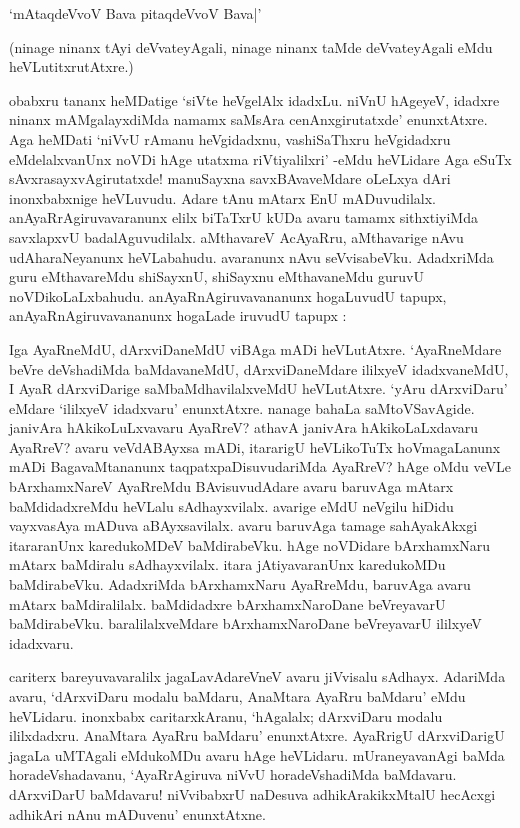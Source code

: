 \begin{shloka}
`mAtaqdeVvoV Bava pitaqdeVvoV Bava|'
\end{shloka}

(ninage ninanx tAyi deVvateyAgali, ninage ninanx taMde deVvateyAgali eMdu heVLutitxrutAtxre.)

obabxru tananx heMDatige `siVte heVgelAlx idadxLu. niVnU hAgeyeV, idadxre ninanx mAMgalayxdiMda namamx saMsAra cenAnxgirutatxde' enunxtAtxre. Aga heMDati `niVvU rAmanu heVgidadxnu, vashiSaThxru heVgidadxru eMdelalxvanUnx noVDi hAge utatxma riVtiyalilxri' -eMdu heVLidare Aga eSuTx sAvxrasayxvAgirutatxde! manuSayxna savxBAvaveMdare oLeLxya dAri inonxbabxnige heVLuvudu. Adare tAnu mAtarx EnU mADuvudilalx. anAyaRrAgiruvavaranunx elilx biTaTxrU kUDa avaru tamamx sithxtiyiMda savxlapxvU badalAguvudilalx. aMthavareV AcAyaRru, aMthavarige nAvu udAharaNeyanunx heVLabahudu. avaranunx nAvu seVvisabeVku. AdadxriMda guru eMthavareMdu shiSayxnU, shiSayxnu eMthavaneMdu guruvU noVDikoLaLxbahudu. anAyaRnAgiruvavananunx hogaLuvudU tapupx, anAyaRnAgiruvavananunx hogaLade iruvudU tapupx :


Iga AyaRneMdU, dArxviDaneMdU viBAga mADi heVLutAtxre. `AyaRneMdare beVre deVshadiMda baMdavaneMdU, dArxviDaneMdare ililxyeV idadxvaneMdU, I AyaR dArxviDarige saMbaMdhavilalxveMdU heVLutAtxre. `yAru dArxviDaru' eMdare `ililxyeV idadxvaru' enunxtAtxre. nanage bahaLa saMtoVSavAgide. janivAra hAkikoLuLxvavaru AyaRreV? athavA janivAra hAkikoLaLxdavaru AyaRreV? avaru veVdABAyxsa mADi, itararigU heVLikoTuTx hoVmagaLanunx mADi BagavaMtananunx taqpatxpaDisuvudariMda AyaRreV? hAge oMdu veVLe bArxhamxNareV AyaRreMdu BAvisuvudAdare avaru baruvAga mAtarx baMdidadxreMdu heVLalu sAdhayxvilalx. avarige eMdU neVgilu hiDidu vayxvasAya mADuva aBAyxsavilalx. avaru baruvAga tamage sahAyakAkxgi itararanUnx karedukoMDeV baMdirabeVku. hAge noVDidare bArxhamxNaru mAtarx baMdiralu sAdhayxvilalx. itara jAtiyavaranUnx karedukoMDu baMdirabeVku. AdadxriMda bArxhamxNaru AyaRreMdu, baruvAga avaru mAtarx baMdiralilalx. baMdidadxre bArxhamxNaroDane beVreyavarU baMdirabeVku. baralilalxveMdare bArxhamxNaroDane beVreyavarU ililxyeV idadxvaru.

cariterx bareyuvavaralilx jagaLavAdareVneV avaru jiVvisalu sAdhayx. AdariMda avaru, `dArxviDaru modalu baMdaru, AnaMtara AyaRru baMdaru' eMdu heVLidaru. inonxbabx caritarxkAranu, `hAgalalx; dArxviDaru modalu ililxdadxru. AnaMtara AyaRru baMdaru' enunxtAtxre. AyaRrigU dArxviDarigU jagaLa uMTAgali eMdukoMDu avaru hAge heVLidaru. mUraneyavanAgi baMda horadeVshadavanu, `AyaRrAgiruva niVvU horadeVshadiMda baMdavaru. dArxviDarU baMdavaru! niVvibabxrU naDesuva adhikArakikxMtalU hecAcxgi adhikAri nAnu mADuvenu' enunxtAtxne.


